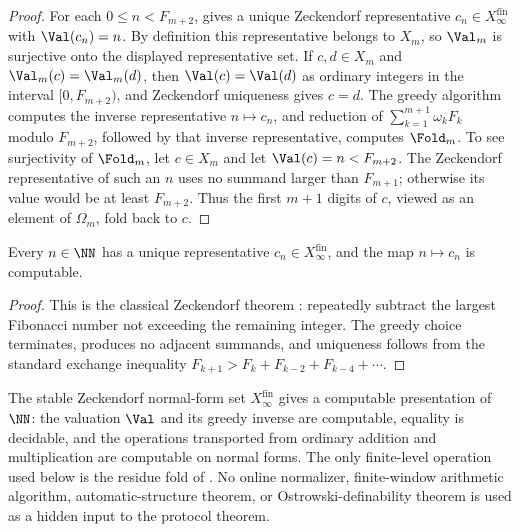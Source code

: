 \begin{proof}
For each \(0\le n<F_{m+2}\),  gives a
unique Zeckendorf representative \(c_n\in X_\infty^{\mathrm{fin}}\) with
\(\Val(c_n)=n\).  By definition this representative belongs to \(X_m\), so
\(\Val_m\) is surjective onto the displayed representative set.  If
\(c,d\in X_m\) and \(\Val_m(c)=\Val_m(d)\), then \(\Val(c)=\Val(d)\) as ordinary
integers in the interval \([0,F_{m+2})\), and Zeckendorf uniqueness gives
\(c=d\).  The greedy algorithm computes the inverse representative
\(n\mapsto c_n\), and reduction of \(\sum_{k=1}^{m+1}\omega_kF_k\) modulo
\(F_{m+2}\), followed by that inverse representative, computes \(\Fold_m\).  To
see surjectivity of \(\Fold_m\), let \(c\in X_m\) and let
\(\Val(c)=n<F_{m+2}\).  The Zeckendorf representative of such an \(n\) uses no
summand larger than \(F_{m+1}\); otherwise its value would be at least
\(F_{m+2}\).  Thus the first \(m+1\) digits of \(c\), viewed as an element of
\(\Omega_m\), fold back to \(c\).
\end{proof}

\begin{lemma}
\label{lem:greedy-zeckendorf-normalizer}
Every \(n\in\NN\) has a unique representative \(c_n\in
X_\infty^{\mathrm{fin}}\), and the map \(n\mapsto c_n\) is computable.
\end{lemma}

\begin{proof}
This is the classical Zeckendorf theorem \cite{Zeckendorf1972}: repeatedly
subtract the largest Fibonacci number not exceeding the remaining integer.  The
greedy choice terminates, produces no adjacent summands, and uniqueness follows
from the standard exchange inequality
\(F_{k+1}>F_k+
F_{k-2}+F_{k-4}+\cdots\).
\end{proof}

\begin{proposition}
\label{prop:zeckendorf-computable-arithmetic-anchor}
The stable Zeckendorf normal-form set \(X_\infty^{\mathrm{fin}}\) gives a
computable presentation of \(\NN\): the valuation \(\Val\) and its greedy inverse
are computable, equality is decidable, and the operations transported from
ordinary addition and multiplication are computable on normal forms.  The only
finite-level operation used below is the residue fold of .  No
online normalizer, finite-window arithmetic algorithm, automatic-structure
theorem, or Ostrowski-definability theorem is used as a hidden input to the
protocol theorem.
\end{proposition}

